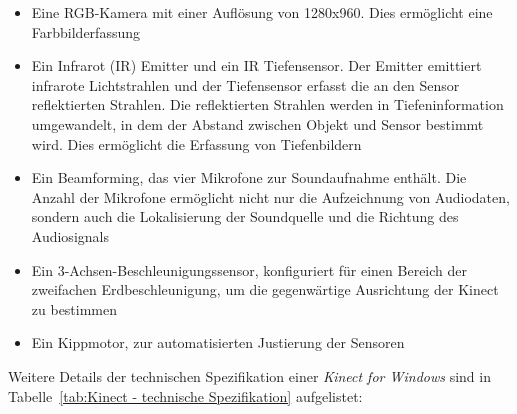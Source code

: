 \begin{itemize}
  \item Eine RGB-Kamera mit einer Aufl\"osung von 1280x960.
  Dies erm\"oglicht eine Farbbilderfassung
  \item Ein Infrarot (IR) Emitter und ein IR Tiefensensor.
  Der Emitter emittiert infrarote Lichtstrahlen und der Tiefensensor erfasst die an den Sensor reflektierten Strahlen.
  Die reflektierten Strahlen werden in Tiefeninformation umgewandelt, in dem der Abstand zwischen Objekt und Sensor bestimmt wird.
  Dies erm\"oglicht die Erfassung von Tiefenbildern
  \item Ein \gls{Beamforming}, das vier Mikrofone zur Soundaufnahme enth\"alt. Die Anzahl der Mikrofone erm\"oglicht nicht nur die Aufzeichnung von Audiodaten,
  sondern auch die Lokalisierung der Soundquelle und die Richtung des Audiosignals
  \item Ein 3-Achsen-Beschleunigungssensor, konfiguriert f\"ur einen Bereich der zweifachen Erdbeschleunigung, um die gegenw\"artige Ausrichtung der Kinect zu bestimmen
  \item Ein Kippmotor, zur automatisierten Justierung der Sensoren
\end{itemize}

Weitere Details der technischen Spezifikation einer \textit{Kinect for Windows} sind in Tabelle~\ref{tab:Kinect - technische Spezifikation} aufgelistet:

